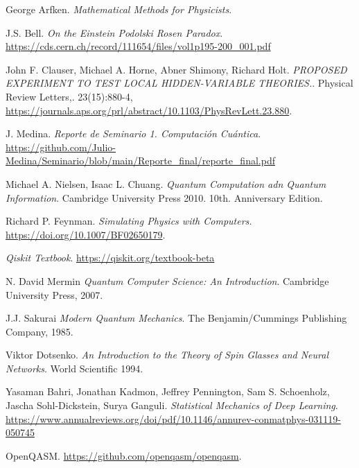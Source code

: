 \documentclass[a4paper]{article}
\begin{document}
\begin{thebibliography}{99}
 George Arfken. \textit{Mathematical Methods for Physicists}.

 J.S. Bell. \textit{On the Einstein Podolski Rosen Paradox}. \url{https://cds.cern.ch/record/111654/files/vol1p195-200_001.pdf}

 John F. Clauser, Michael A. Horne, Abner Shimony, Richard Holt. \textit{PROPOSED EXPERIMENT TO TEST LOCAL HIDDEN-VARIABLE THEORIES.}. Physical Review Letters,. 23(15):880-4, \url{https://journals.aps.org/prl/abstract/10.1103/PhysRevLett.23.880}.

 J. Medina. \textit{Reporte de Seminario 1. Computación Cuántica}. \url{https://github.com/Julio-Medina/Seminario/blob/main/Reporte_final/reporte_final.pdf}

 Michael A. Nielsen, Isaac L. Chuang. \textit{Quantum Computation adn Quantum Information}. Cambridge University Press 2010. 10th. Anniversary Edition.

 Richard P. Feynman. \textit{Simulating Physics with Computers.} \url{https://doi.org/10.1007/BF02650179}.

 \textit{Qiskit Textbook}. \url{https://qiskit.org/textbook-beta}

 N. David Mermin \textit{Quantum Computer Science: An Introduction}. Cambridge University Press, 2007.

 J.J. Sakurai \textit{Modern Quantum Mechanics}. The Benjamin/Cummings Publishing Company, 1985.

 Viktor Dotsenko. \textit{An Introduction to the Theory of Spin Glasses and Neural Networks}. World Scientific 1994.

 Yasaman Bahri, Jonathan Kadmon, Jeffrey Pennington, Sam S. Schoenholz, Jascha Sohl-Dickstein, Surya Ganguli. \textit{Statistical Mechanics of Deep Learning}. \url{https://www.annualreviews.org/doi/pdf/10.1146/annurev-conmatphys-031119-050745}

 OpenQASM. \url{https://github.com/openqasm/openqasm}.
 

\end{thebibliography}
\end{document}

